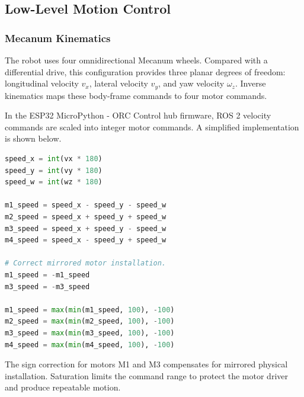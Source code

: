 \documentclass{llncs}
\begin{document}
\subsection{Low-Level Motion Control}
\subsubsection{Mecanum Kinematics}
The robot uses four omnidirectional Mecanum wheels. Compared with a differential drive, this configuration provides three planar degrees of freedom: longitudinal velocity $v_x$, lateral velocity $v_y$, and yaw velocity $\omega_z$. Inverse kinematics maps these body-frame commands to four motor commands.

In the ESP32 MicroPython - ORC Control hub firmware, ROS 2 velocity commands are scaled into integer motor commands. A simplified implementation is shown below.

\begin{lstlisting}[language=Python,caption={MicroPython - ORC Control hub implementation of inverse kinematics.},label={lst:kinematics}]
speed_x = int(vx * 180)
speed_y = int(vy * 180)
speed_w = int(wz * 180)

m1_speed = speed_x - speed_y - speed_w
m2_speed = speed_x + speed_y + speed_w
m3_speed = speed_x + speed_y - speed_w
m4_speed = speed_x - speed_y + speed_w

# Correct mirrored motor installation.
m1_speed = -m1_speed
m3_speed = -m3_speed

m1_speed = max(min(m1_speed, 100), -100)
m2_speed = max(min(m2_speed, 100), -100)
m3_speed = max(min(m3_speed, 100), -100)
m4_speed = max(min(m4_speed, 100), -100)
\end{lstlisting}

The sign correction for motors M1 and M3 compensates for mirrored physical installation. Saturation limits the command range to protect the motor driver and produce repeatable motion.
\end{document}
